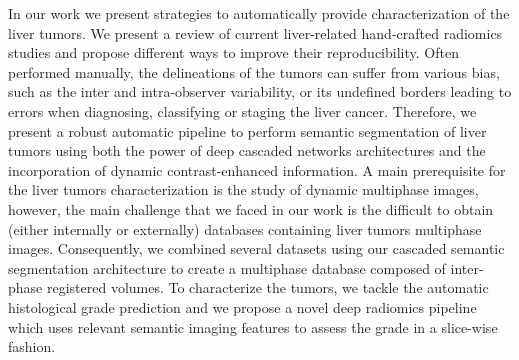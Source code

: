 In our work we present strategies to automatically provide characterization of the liver tumors.
We present a review of current liver-related hand-crafted radiomics studies and propose different ways to improve their reproducibility.
Often performed manually, the delineations of the tumors can suffer from various bias, such as the inter and intra-observer variability, or its undefined borders leading to errors when diagnosing, classifying or staging the liver cancer. Therefore, we present a robust automatic pipeline to perform semantic segmentation of liver tumors using both the power of deep cascaded networks architectures and the incorporation of dynamic contrast-enhanced information. A main prerequisite for the liver tumors characterization is the study of dynamic multiphase images, however, the main challenge that we faced in our work is the difficult to obtain (either internally or externally) databases containing liver tumors multiphase images. Consequently, we combined several datasets using our cascaded semantic segmentation architecture to create a multiphase database composed of inter-phase registered volumes.
To characterize the tumors, we tackle the automatic histological grade prediction and we propose a novel deep radiomics pipeline which uses relevant semantic imaging features to assess the grade in a slice-wise fashion.
